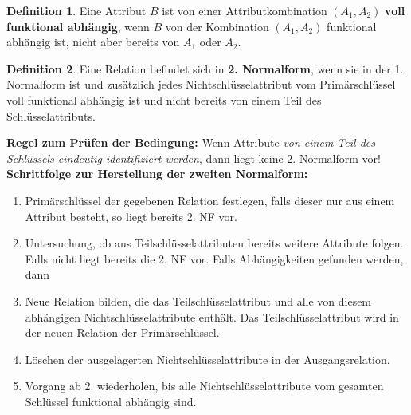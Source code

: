\documentclass[a4paper,10pt,DIV9, BCOR12mm, oneside,openright,openbib]{scrreprt}
\theoremstyle{definition}
\newtheorem{mydef}{Definition}[section]
\theoremstyle{plain}
\begin{document}
  \begin{mydef}
   Eine Attribut $B$ ist von einer Attributkombination $(A_1 , A_2)$ \textbf{voll funktional abhängig}, wenn $B$ von der Kombination $(A_1 , A_2)$ funktional abhängig ist, nicht aber bereits von $A_1$ oder $A_2$.
  \end{mydef}

  \begin{mydef}
   Eine Relation befindet sich in \textbf{2. Normalform}, wenn sie in der 1. Normalform ist und zusätzlich jedes Nichtschlüsselattribut vom Primärschlüssel voll funktional abhängig ist und nicht bereits von einem Teil des Schlüsselattributs.
  \end{mydef}
  \textbf{Regel zum Prüfen der Bedingung:} Wenn Attribute \textit{von einem Teil des Schlüssels eindeutig identifiziert werden}, dann liegt keine 2. Normalform vor!\\
  \textbf{Schrittfolge zur Herstellung der zweiten Normalform:}
    \begin{enumerate}
      \item Primärschlüssel der gegebenen Relation festlegen, falls dieser nur aus einem Attribut besteht, so liegt bereits 2. NF vor.
      \item Untersuchung, ob aus Teilschlüsselattributen bereits weitere Attribute folgen. Falls nicht liegt bereits die 2. NF vor. Falls Abhängigkeiten gefunden werden, dann
      \item Neue Relation bilden, die das Teilschlüsselattribut und alle von diesem abhängigen Nichtschlüsselattribute enthält. Das Teilschlüsselattribut wird in der neuen Relation der Primärschlüssel.
      \item Löschen der ausgelagerten Nichtschlüsselattribute in der Ausgangsrelation.
      \item Vorgang ab 2. wiederholen, bis alle Nichtschlüsselattribute vom gesamten Schlüssel funktional abhängig sind.
    \end{enumerate}
\end{document}
